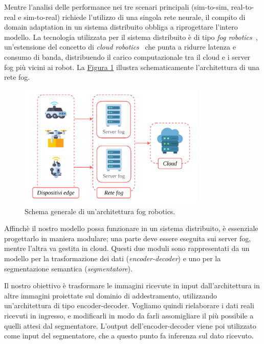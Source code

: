 \documentclass[12pt]{report}
\begin{document}
Mentre l'analisi delle performance nei tre scenari principali (sim-to-sim, real-to-real e sim-to-real) richiede l'utilizzo di una singola rete neurale, il compito di domain adaptation in un sistema distribuito obbliga a riprogettare l'intero modello. La tecnologia utilizzata per il sistema distribuito è di tipo \textit{fog robotics}~\cite{10.1145/2757384.2757397}, un'estensione del concetto di \textit{cloud robotics}~\cite{qian2009cloud} che punta a ridurre latenza e consumo di banda, distribuendo il carico computazionale tra il cloud e i server fog più vicini ai robot. La \hyperref[fig:fog_robotics]{Figura \ref{fig:fog_robotics}} illustra schematicamente l'architettura di una rete fog.

\begin{figure}[t]
	\centering
	\includegraphics[width=0.8\textwidth, clip]{images/fog-robotics}
	\caption{Schema generale di un'architettura fog robotics.}
	\label{fig:fog_robotics}
\end{figure} 

Affinchè il nostro modello possa funzionare in un sistema distribuito, è essenziale progettarlo in maniera modulare; una parte deve essere eseguita sui server fog, mentre l'altra va gestita in cloud. Questi due moduli sono rappresentati da un modello per la trasformazione dei dati (\textit{encoder-decoder}) e uno per la segmentazione semantica (\textit{segmentatore}).

Il nostro obiettivo è trasformare le immagini ricevute in input dall'architettura in altre immagini proiettate sul dominio di addestramento, utilizzando un'architettura di tipo encoder-decoder. Vogliamo quindi rielaborare i dati reali ricevuti in ingresso, e modificarli in modo da farli assomigliare il più possibile a quelli attesi dal segmentatore. L'output dell'encoder-decoder viene poi utilizzato come input del segmentatore, che a questo punto fa inferenza sul dato ricevuto.
\end{document}
